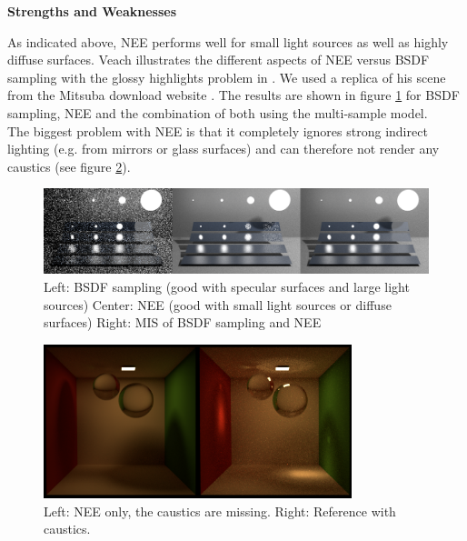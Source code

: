\textbf{Strengths and Weaknesses}

As indicated above, NEE performs well for small light sources as well as highly diffuse surfaces. Veach illustrates the different aspects of NEE versus BSDF sampling with the glossy highlights problem in \cite[chapter 9.3.1]{veachdiss}. We used a replica of his scene from the Mitsuba download website \cite{mitsuba}. The results are shown in figure \ref{veach_mis} for BSDF sampling, NEE and the combination of both using the multi-sample model.\\
The biggest problem with NEE is that it completely ignores strong indirect lighting (e.g. from mirrors or glass surfaces) and can therefore not render any caustics (see figure \ref{nee_caustics}).

 \begin{figure}[ht]
 \centering
 \includegraphics[width=1\textwidth]{bilder/veach/bsdf_nee_beids_64.png}
\caption{Left: BSDF sampling (good with specular surfaces and large light sources)\newline
Center: NEE (good with small light sources or diffuse surfaces)\newline
Right: MIS of BSDF sampling and NEE}
 \label{veach_mis}\end{figure}



 \begin{figure}[ht]
 \centering
 \includegraphics[width=0.8\textwidth]{bilder/kugelbox/nee_caustics.png}
\caption{Left: NEE only, the caustics are missing. Right: Reference with caustics.}
  \label{nee_caustics}\end{figure}



